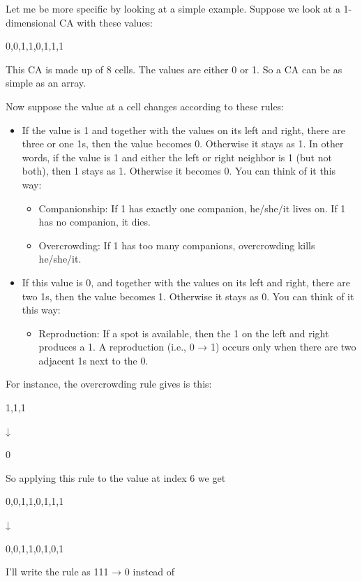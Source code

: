 \documentclass[
]{article}
\providecommand{\tightlist}{%
  \setlength{\itemsep}{0pt}\setlength{\parskip}{0pt}}
\begin{document}
Let me be more specific by looking at a simple example. Suppose we look
at a 1-dimensional CA with these values:

0,0,1,1,0,1,1,1

This CA is made up of 8 cells. The values are either 0 or 1. So a CA can
be as simple as an array.

Now suppose the value at a cell changes according to these rules:

\begin{itemize}
\item
  If the value is 1 and together with the values on its left and right,
  there are three or one 1s, then the value becomes 0. Otherwise it
  stays as 1. In other words, if the value is 1 and either the left or
  right neighbor is 1 (but not both), then 1 stays as 1. Otherwise it
  becomes 0. You can think of it this way:

  \begin{itemize}
  \tightlist
  \item
    Companionship: If 1 has exactly one companion, he/she/it lives on.
    If 1 has no companion, it dies.
  \item
    Overcrowding: If 1 has too many companions, overcrowding kills
    he/she/it.
  \end{itemize}
\item
  If this value is 0, and together with the values on its left and
  right, there are two 1s, then the value becomes 1. Otherwise it stays
  as 0. You can think of it this way:

  \begin{itemize}
  \tightlist
  \item
    Reproduction: If a spot is available, then the 1 on the left and
    right produces a 1. A reproduction (i.e., 0 → 1) occurs only when
    there are two adjacent 1s next to the 0.
  \end{itemize}
\end{itemize}

For instance, the overcrowding rule gives is this:

1,1,1

↓

0

So applying this rule to the value at index 6 we get

0,0,1,1,0,1,1,1

↓

0,0,1,1,0,1,0,1

I'll write the rule as 111 → 0 instead of
\end{document}
